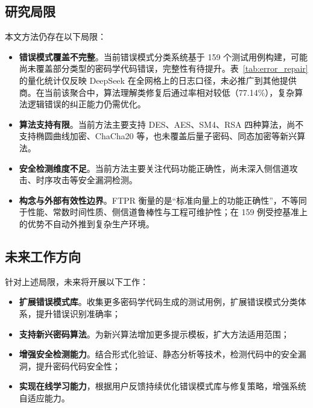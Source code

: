 \documentclass[12pt]{llncs}
\begin{document}
\subsection{研究局限}
本文方法仍存在以下局限：
\begin{itemize}
    \item \textbf{错误模式覆盖不完整}。当前错误模式分类系统基于 159 个测试用例构建，可能尚未覆盖部分类型的密码学代码错误，完整性有待提升。表~\ref{tab:error_repair} 的量化统计仅反映 DeepSeek 在全网格上的日志口径，未必推广到其他提供商。在当前该聚合中，算法理解类修复后通过率相对较低（77.14\%），复杂算法逻辑错误的纠正能力仍需优化。
    \item \textbf{算法支持有限}。当前方法主要支持 DES、AES、SM4、RSA 四种算法，尚不支持椭圆曲线加密、ChaCha20 等，也未覆盖后量子密码、同态加密等新兴算法。
    \item \textbf{安全检测维度不足}。当前方法主要关注代码功能正确性，尚未深入侧信道攻击、时序攻击等安全漏洞检测。
    \item \textbf{构念与外部有效性边界}。FTPR 衡量的是“标准向量上的功能正确性”，不等同于性能、常数时间性质、侧信道鲁棒性与工程可维护性；在 159 例受控基准上的优势不自动外推到复杂生产环境。
\end{itemize}

\subsection{未来工作方向}
针对上述局限，未来将开展以下工作：
\begin{itemize}
    \item \textbf{扩展错误模式库}。收集更多密码学代码生成的测试用例，扩展错误模式分类体系，提升错误识别准确率；
    \item \textbf{支持新兴密码算法}。为新兴算法增加更多提示模板，扩大方法适用范围；
    \item \textbf{增强安全检测能力}。结合形式化验证、静态分析等技术，检测代码中的安全漏洞，提升密码代码安全性；
    \item \textbf{实现在线学习能力}，根据用户反馈持续优化错误模式库与修复策略，增强系统自适应能力。
\end{itemize}


\renewcommand{\refname}{参考文献}
\renewcommand{\bibname}{参考文献}

 
\end{document}
